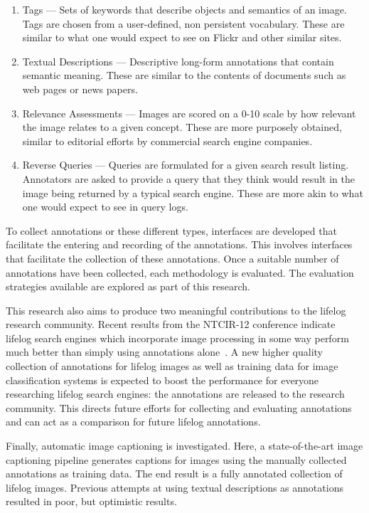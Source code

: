 \begin{enumerate}
    \item Tags --- Sets of keywords that describe objects and semantics of an image. Tags are chosen from a user-defined, non persistent vocabulary. These are similar to what one would expect to see on Flickr and other similar sites.
    \item Textual Descriptions --- Descriptive long-form annotations that contain semantic meaning. These are similar to the contents of documents such as web pages or news papers.
    \item Relevance Assessments --- Images are scored on a 0-10 scale by how relevant the image relates to a given concept. These are more purposely obtained, similar to editorial efforts by commercial search engine companies.
    \item Reverse Queries --- Queries are formulated for a given search result listing. Annotators are asked to provide a query that they think would result in the image being returned by a typical search engine. These are more akin to what one would expect to see in query logs.
\end{enumerate}

To collect annotations or these different types, interfaces are developed that facilitate the entering and recording of the annotations. This involves interfaces that facilitate the collection of these annotations. Once a suitable number of annotations have been collected, each methodology is evaluated. The evaluation strategies available are explored as part of this research.

This research also aims to produce two meaningful contributions to the lifelog research community. Recent results from the NTCIR-12 conference indicate lifelog search engines which incorporate image processing in some way perform much better than simply using annotations alone~\cite{safadilig2016ligmrim}. A new higher quality collection of annotations for lifelog images as well as training data for image classification systems is expected to boost the performance for everyone researching lifelog search engines: the annotations are released to the research community. This directs future efforts for collecting and evaluating annotations and can act as a comparison for future lifelog annotations.

Finally, automatic image captioning is investigated. Here, a state-of-the-art image captioning pipeline generates captions for images using the manually collected annotations as training data. The end result is a fully annotated collection of lifelog images. Previous attempts at using textual descriptions as annotations~\cite{scells2016qut} resulted in poor, but optimistic results. 

